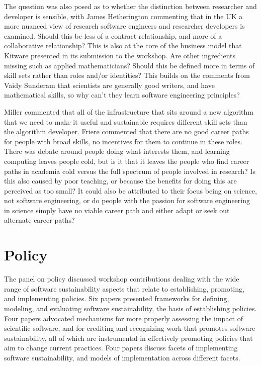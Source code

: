 \documentclass[11pt, oneside]{amsart}
\newcommand{\note}[1]{ {\textcolor{red}    { #1 }}}
\begin{document}
The question was also posed as to whether the distinction between
researcher and developer is sensible, with James Hetherington
commenting that in the UK a more nuanced view of research software
engineers and researcher developers is examined. Should this be less
of a contract relationship, and more of a collaborative relationship?
This is also at the core of the business model that Kitware presented
in its submission to the workshop. Are other ingredients missing such
as applied mathematicians? Should this be defined more in terms of
skill sets rather than roles and/or identities? This builds on the
comments from Vaidy Sunderam that scientists are generally good
writers, and have mathematical skills, so why can't they learn
software engineering principles?

Miller commented that all of the infrastructure that sits around a new
algorithm that we need to make it useful and sustainable requires
different skill sets than the algorithm developer. Friere commented
that there are no good career paths for people with broad skills, no
incentives for them to continue in these roles. There was debate
around people doing what interests them, and learning computing leaves
people cold, but is it that it leaves the people who find career paths
in academia cold versus the full spectrum of people involved in
research? Is this also caused by poor teaching, or because the
benefits for doing this are perceived as too small? It could also be
attributed to their focus being on science, not software engineering,
or do people with the passion for software engineering in science
simply have no viable career path and either adapt or seek out
alternate career paths?

\section{Policy} \label{sec:policy}%

The panel on policy discussed workshop contributions dealing with the
wide range of software sustainability aspects that relate to
establishing, promoting, and implementing policies. Six papers
presented frameworks for defining, modeling, and evaluating software
sustainability, the basis of establishing policies. Four papers
advocated mechanisms for more properly assessing the impact of
scientific software, and for crediting and recognizing work that
promotes software sustainability, all of which are instrumental in
effectively promoting policies that aim to change current
practices. Four papers discuss facets of implementing software
sustainability, and models of implementation across different facets.
\end{document}
